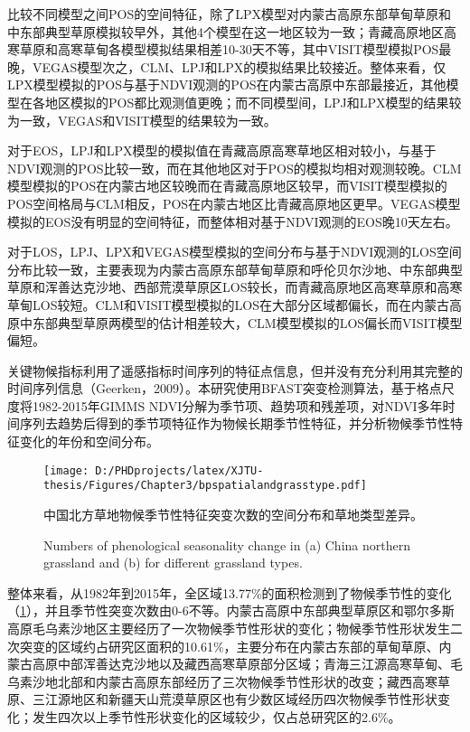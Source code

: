 比较不同模型之间POS的空间特征，除了LPX模型对内蒙古高原东部草甸草原和中东部典型草原模拟较早外，其他4个模型在这一地区较为一致；青藏高原地区高寒草原和高寒草甸各模型模拟结果相差10-30天不等，其中VISIT模型模拟POS最晚，VEGAS模型次之，CLM、LPJ和LPX的模拟结果比较接近。整体来看，仅LPX模型模拟的POS与基于NDVI观测的POS在内蒙古高原中东部最接近，其他模型在各地区模拟的POS都比观测值更晚；而不同模型间，LPJ和LPX模型的结果较为一致，VEGAS和VISIT模型的结果较为一致。

对于EOS，LPJ和LPX模型的模拟值在青藏高原高寒草地区相对较小，与基于NDVI观测的POS比较一致，而在其他地区对于POS的模拟均相对观测较晚。CLM模型模拟的POS在内蒙古地区较晚而在青藏高原地区较早，而VISIT模型模拟的POS空间格局与CLM相反，POS在内蒙古地区比青藏高原地区更早。VEGAS模型模拟的EOS没有明显的空间特征，而整体相对基于NDVI观测的EOS晚10天左右。

对于LOS，LPJ、LPX和VEGAS模型模拟的空间分布与基于NDVI观测的LOS空间分布比较一致，主要表现为内蒙古高原东部草甸草原和呼伦贝尔沙地、中东部典型草原和浑善达克沙地、西部荒漠草原区LOS较长，而青藏高原地区高寒草原和高寒草甸LOS较短。CLM和VISIT模型模拟的LOS在大部分区域都偏长，而在内蒙古高原中东部典型草原两模型的估计相差较大，CLM模型模拟的LOS偏长而VISIT模型偏短。


关键物候指标利用了遥感指标时间序列的特征点信息，但并没有充分利用其完整的时间序列信息（Geerken，2009）。本研究使用BFAST突变检测算法，基于格点尺度将1982-2015年GIMMS NDVI分解为季节项、趋势项和残差项，对NDVI多年时间序列去趋势后得到的季节项特征作为物候长期季节性特征，并分析物候季节性特征变化的年份和空间分布。

\begin{figure}[h]
  \centering
  \texttt{[image: D:/PHDprojects/latex/XJTU-thesis/Figures/Chapter3/bpspatialandgrasstype.pdf]}
  \caption{中国北方草地物候季节性特征突变次数的空间分布和草地类型差异。}
  \addtocounter{figure}{-1}
  \vspace{5pt}
  \renewcommand{\figurename}{Fig}
  \caption{Numbers of phenological seasonality change in (a) China northern grassland and (b) for different grassland types.}
  \label{figure43}
\end{figure}

整体来看，从1982年到2015年，全区域13.77\%的面积检测到了物候季节性的变化（\cref{figure43}），并且季节性突变次数由0-6不等。内蒙古高原中东部典型草原区和鄂尔多斯高原毛乌素沙地区主要经历了一次物候季节性形状的变化；物候季节性形状发生二次突变的区域约占研究区面积的10.61\%，主要分布在内蒙古东部的草甸草原、内蒙古高原中部浑善达克沙地以及藏西高寒草原部分区域；青海三江源高寒草甸、毛乌素沙地北部和内蒙古高原东部经历了三次物候季节性形状的改变；藏西高寒草原、三江源地区和新疆天山荒漠草原区也有少数区域经历四次物候季节性形状变化；发生四次以上季节性形状变化的区域较少，仅占总研究区的2.6\%。

